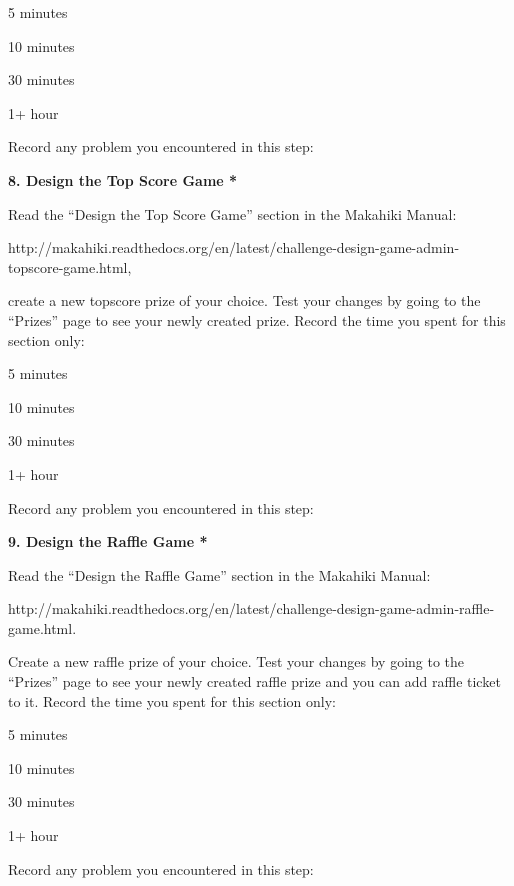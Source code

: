 \begin{radiobutton}
\item 5 minutes
\item  10 minutes
\item  30 minutes
\item  1+ hour
\end{radiobutton}

Record any problem you encountered in this step: \underline{\hspace{4cm}}

{\bf 8. Design the Top Score Game *}

Read the ``Design the Top Score Game'' section in the Makahiki Manual:

http://makahiki.readthedocs.org/en/latest/challenge-design-game-admin-topscore-game.html, 

create a new topscore prize of your choice. Test your changes by going to the ``Prizes'' page to see your newly created prize. Record the time you spent for this section only:

\begin{radiobutton}
\item 5 minutes
\item  10 minutes
\item  30 minutes
\item  1+ hour
\end{radiobutton}

Record any problem you encountered in this step: \underline{\hspace{4cm}}

{\bf 9. Design the Raffle Game *}

Read the ``Design the Raffle Game'' section in the Makahiki Manual:

http://makahiki.readthedocs.org/en/latest/challenge-design-game-admin-raffle-game.html. 

Create a new raffle prize of your choice. Test your changes by going to the ``Prizes'' page to see your newly created raffle prize and you can add raffle ticket to it. Record the time you spent for this section only:

\begin{radiobutton}
\item 5 minutes
\item  10 minutes
\item  30 minutes
\item  1+ hour
\end{radiobutton}

Record any problem you encountered in this step: \underline{\hspace{4cm}}

